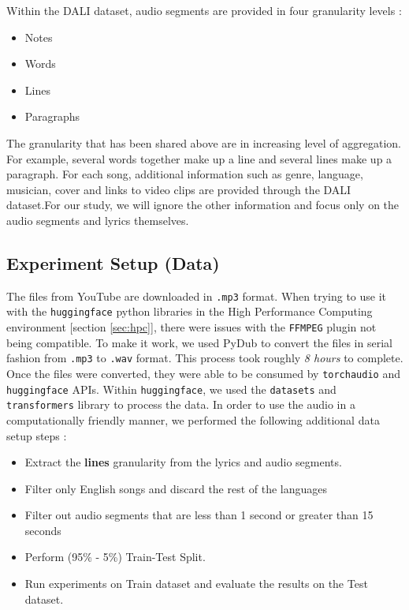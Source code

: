 Within the DALI dataset, audio segments are provided in four granularity levels :

\begin{itemize}
    \item Notes
    \item Words
    \item Lines
    \item Paragraphs
\end{itemize}

The granularity that has been shared above are in increasing level of aggregation. For example, several words together make up a line and several lines make up a paragraph. For each song, additional information such as genre, language, musician, cover and links to video clips are provided through the DALI dataset.For our study, we will ignore the other information and focus only on the audio segments and lyrics themselves.


\subsection{Experiment Setup (Data)}
\label{subsec:datasetup}

The files from YouTube are downloaded in \texttt{.mp3} format. When trying to use it with the \texttt{huggingface} python libraries in the High Performance Computing environment [section \ref{sec:hpc}], there were issues with the \texttt{FFMPEG} plugin not being compatible. To make it work, we used PyDub \cite{robert2018pydub} to convert the files in serial fashion from \texttt{.mp3} to \texttt{.wav} format. This process took roughly \textit{8 hours} to complete. Once the files were converted, they were able to be consumed by \texttt{torchaudio} and \texttt{huggingface} APIs. Within \texttt{huggingface}, we used the \texttt{datasets} and \texttt{transformers} library to process the data. In order to use the audio in a computationally friendly manner, we performed the following additional data setup steps :

\begin{itemize}
    \item Extract the \textbf{lines} granularity from the lyrics and audio segments.
    \item Filter only English songs and discard the rest of the languages
    \item Filter out audio segments that are less than 1 second or greater than 15 seconds
    \item Perform (95\% - 5\%) Train-Test Split.
    \item Run experiments on Train dataset and evaluate the results on the Test dataset.
\end{itemize}


